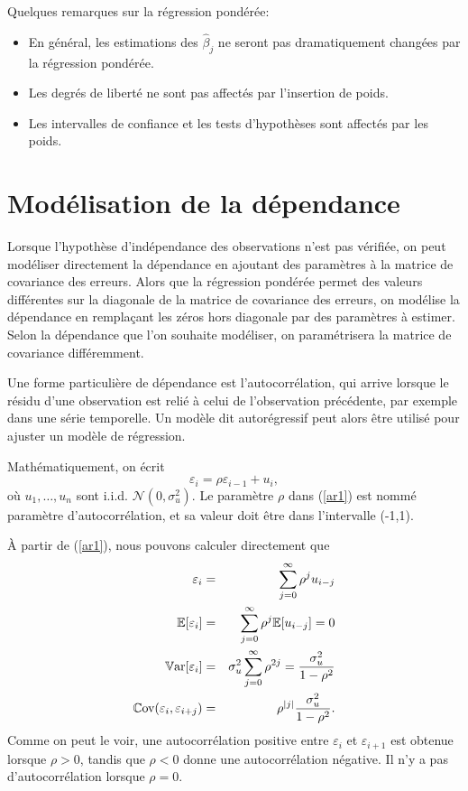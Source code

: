 Quelques remarques sur la régression pondérée:
\begin{itemize}
\item En général, les estimations des $\hat\beta_j$ ne seront pas dramatiquement changées par la régression pondérée.
\item Les degrés de liberté ne sont pas affectés par l'insertion de poids. %
\item Les intervalles de confiance et les tests d'hypothèses sont affectés par les poids.
\end{itemize}

\newpage

\section{Modélisation de la dépendance}

Lorsque l'hypothèse d'indépendance des observations n'est pas vérifiée, on peut modéliser directement la dépendance en ajoutant des paramètres à la matrice de covariance des erreurs. Alors que la régression pondérée permet des valeurs différentes sur la diagonale de la matrice de covariance des erreurs, on modélise la dépendance en remplaçant les zéros hors diagonale par des paramètres à estimer. Selon la dépendance que l'on souhaite modéliser, on paramétrisera la matrice de covariance différemment.


Une forme particulière de dépendance est l'autocorrélation, qui arrive lorsque le résidu d'une observation est relié à celui de l'observation précédente, par exemple dans une série temporelle. Un modèle dit autorégressif peut alors être utilisé pour ajuster un modèle de régression.

Mathématiquement, on écrit
\begin{equation}\label{ar1}
\varepsilon_i=\rho\varepsilon_{i-1}+u_i, \end{equation} o\`u
$u_1,\ldots,u_n$ sont i.i.d. $\mathcal{N}(0,\sigma_u^2)$. Le paramètre
$\rho$ dans (\ref{ar1}) est nommé paramètre
d'au\-to\-cor\-ré\-la\-tion, et sa valeur doit \^etre dans
l'intervalle (-1,1).

\`A partir de (\ref{ar1}), nous pouvons
calculer directement que
\begin{eqnarray*}
\varepsilon_i&=&\sum_{j=0}^\infty\rho^ju_{i-j}\\
\mathbb{E}[\varepsilon_i]&=&\sum_{j=0}^\infty\rho^j\mathbb{E}[u_{i-j}]=0\\
\mathbb{V}\text{ar}[\varepsilon_i]&=&\sigma_u^2\sum_{j=0}^\infty\rho^{2j}={\sigma_u^2\over1-\rho^2}\\
\mathbb{C}\text{ov}(\varepsilon_i,\varepsilon_{i+j})&=&\rho^{|j|}{\sigma_u^2\over1-\rho^2}.
\end{eqnarray*}
Comme on peut le voir, une autocorrélation positive entre
$\varepsilon_i$ et $\varepsilon_{i+1}$ est obtenue lorsque $\rho>0$,
tandis que $\rho<0$ donne une autocorrélation négative. Il n'y a
pas d'autocorrélation lorsque $\rho=0$.



